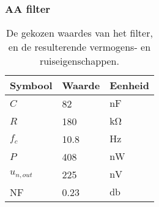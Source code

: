 \begin{frame}
    \frametitle{AA filter}

    \begin{table}[ht]
        \centering
        \begin{tabular}{l|l|l}
            Symbool & Waarde & Eenheid \\
            \hline
            $C$         & 82    & $\si{\nano\farad}$\\
            $R$         & 180   & $\si{\kilo\ohm}$  \\
            $f_c$       & 10.8  & $\si{\hertz}$     \\
            $P$         & 408   & $\si{\nano\watt}$ \\
            $u_{n,out}$ & 225   & $\si{\nano\volt}$ \\
            NF          & 0.23  & $\si{\decibel}$   \\
        \end{tabular}
        \caption{De gekozen waardes van het filter, en de resulterende vermogens- en ruiseigenschappen.}
        \label{tab:filterValues}
    \end{table}

\end{frame}